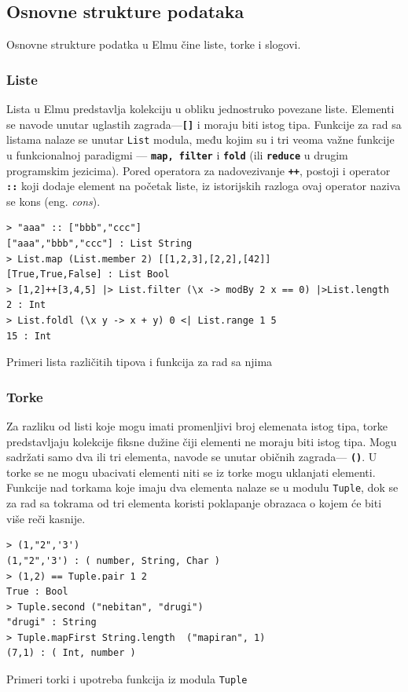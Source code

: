 \documentclass[12pt,oneside]{memoir}
\begin{document}
\subsection{Osnovne strukture podataka}
Osnovne strukture podatka u Elmu čine liste, torke i slogovi. 
\subsubsection{Liste}
Lista u Elmu predstavlja kolekciju u obliku jednostruko povezane liste. Elementi se navode
unutar uglastih zagrada---\textbf{\texttt{[\smallskip ]}} i moraju biti istog tipa. Funkcije za rad
sa listama nalaze se unutar \texttt{List} modula, među kojim su i tri veoma važne funkcije 
u funkcionalnoj paradigmi --- \textbf{\texttt{map, filter}} i \textbf{\texttt{fold}} (ili
\textbf{\texttt{reduce}} u drugim programskim jezicima).
Pored operatora za nadovezivanje \textbf{\texttt{++}}, postoji i operator \textbf{\texttt{::}} koji
dodaje element na početak liste, iz istorijskih razloga ovaj operator naziva se kons
(eng. \emph{cons}). 
\begin{listing}[h]
\begin{verbatim}
> "aaa" :: ["bbb","ccc"]
["aaa","bbb","ccc"] : List String
> List.map (List.member 2) [[1,2,3],[2,2],[42]]
[True,True,False] : List Bool
> [1,2]++[3,4,5] |> List.filter (\x -> modBy 2 x == 0) |>List.length
2 : Int
> List.foldl (\x y -> x + y) 0 <| List.range 1 5 
15 : Int
\end{verbatim}
\caption{Primeri lista različitih tipova i funkcija za rad sa njima}
\label{listing:liste}
\end{listing}
\subsubsection{Torke}
Za razliku od listi koje mogu imati promenljivi broj elemenata istog tipa, torke
predstavljaju kolekcije fiksne dužine čiji elementi ne moraju biti istog tipa.
Mogu sadržati samo dva ili tri elementa, navode se unutar običnih zagrada---
\textbf{\texttt{()}}. U torke se ne mogu ubacivati elementi niti se iz torke mogu
uklanjati elementi. Funkcije nad torkama koje imaju dva elementa nalaze se u modulu
\texttt{Tuple}, dok se za rad sa tokrama od tri elementa koristi poklapanje obrazaca
o kojem će biti više reči kasnije.
\begin{listing}[h]
\begin{verbatim}
> (1,"2",'3')
(1,"2",'3') : ( number, String, Char )
> (1,2) == Tuple.pair 1 2
True : Bool
> Tuple.second ("nebitan", "drugi")
"drugi" : String
> Tuple.mapFirst String.length  ("mapiran", 1)
(7,1) : ( Int, number )
\end{verbatim}
\caption{Primeri torki i upotreba funkcija iz modula \texttt{Tuple}}
\label{listing:torke}
\end{listing}
\end{document}
